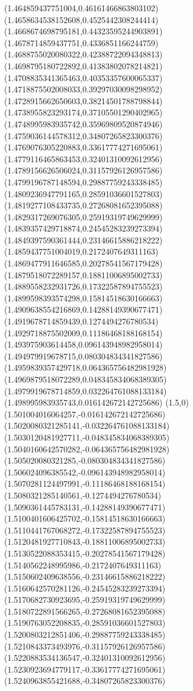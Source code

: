 \documentclass[12pt]{article}
\theoremstyle{plain}
\theoremstyle{definition}
\theoremstyle{remark}
\begin{document}
\begin{figure}
{  (1.464859437751004,0.46161466863803102)%
  (1.4658634538152608,0.4525442308244414)%
  (1.4668674698795181,0.44323595244903891)%
  (1.4678714859437751,0.4336851166244759)%
  (1.4688755020080322,0.42388722094348813)%
  (1.4698795180722892,0.41383802078214821)%
  (1.4708835341365463,0.40353357600065337)%
  (1.4718875502008033,0.39297030098298952)%
  (1.4728915662650603,0.38214501788798844)%
  (1.4738955823293174,0.37105501290402965)%
  (1.4748995983935742,0.35969809520874946)%
  (1.4759036144578312,0.34807265823300376)%
  (1.4769076305220883,0.33617774271695061)%
  (1.4779116465863453,0.32401310092612956)%
  (1.4789156626506024,0.31157926126957586)%
  (1.4799196787148594,0.29887759243338485)%
  (1.4809236947791165,0.28591036601527803)%
  (1.4819277108433735,0.27268081652395088)%
  (1.4829317269076305,0.25919319749629999)%
  (1.4839357429718874,0.24545283239273394)%
  (1.4849397590361444,0.23146615886218222)%
  (1.4859437751004019,0.2172407649311163)%
  (1.4869477911646585,0.20278541567179428)%
  (1.4879518072289157,0.18811006895002733)%
  (1.4889558232931726,0.17322587894755523)%
  (1.4899598393574298,0.15814518630166663)%
  (1.4909638554216869,0.14288149390677471)%
  (1.4919678714859439,0.1274494276780534)%
  (1.4929718875502009,0.11186468188168154)%
  (1.493975903614458,0.096143948982958014)%
  (1.494979919678715,0.080304834341827586)%
  (1.4959839357429718,0.064365756482981928)%
  (1.4969879518072289,0.048345834068389305)%
  (1.4979919678714859,0.032264761088133184)%
  (1.498995983935743,0.016142672142725686)%
  (1.5,0)%
  (1.501004016064257,-0.016142672142725686)%
  (1.5020080321285141,-0.032264761088133184)%
  (1.5030120481927711,-0.048345834068389305)%
  (1.5040160642570282,-0.064365756482981928)%
  (1.505020080321285,-0.080304834341827586)%
  (1.506024096385542,-0.096143948982958014)%
  (1.5070281124497991,-0.11186468188168154)%
  (1.5080321285140561,-0.1274494276780534)%
  (1.5090361445783131,-0.14288149390677471)%
  (1.5100401606425702,-0.15814518630166663)%
  (1.5110441767068272,-0.17322587894755523)%
  (1.5120481927710843,-0.18811006895002733)%
  (1.5130522088353415,-0.20278541567179428)%
  (1.5140562248995986,-0.2172407649311163)%
  (1.5150602409638556,-0.23146615886218222)%
  (1.5160642570281126,-0.24545283239273394)%
  (1.5170682730923695,-0.25919319749629999)%
  (1.5180722891566265,-0.27268081652395088)%
  (1.5190763052208835,-0.28591036601527803)%
  (1.5200803212851406,-0.29887759243338485)%
  (1.5210843373493976,-0.31157926126957586)%
  (1.5220883534136547,-0.32401310092612956)%
  (1.5230923694779117,-0.33617774271695061)%
  (1.5240963855421688,-0.34807265823300376)%
}
\end{figure}
\end{document}
